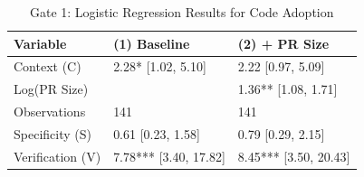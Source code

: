 \begin{table}
\caption{Gate 1: Logistic Regression Results for Code Adoption}
\label{tab:gate1}
\begin{tabular}{lll}
\toprule
Variable & (1) Baseline & (2) + PR Size \\
\midrule
Context (C) & 2.28* [1.02, 5.10] & 2.22 [0.97, 5.09] \\
Log(PR Size) &  & 1.36** [1.08, 1.71] \\
Observations & 141 & 141 \\
Specificity (S) & 0.61 [0.23, 1.58] & 0.79 [0.29, 2.15] \\
Verification (V) & 7.78*** [3.40, 17.82] & 8.45*** [3.50, 20.43] \\
\bottomrule
\end{tabular}
\end{table}
